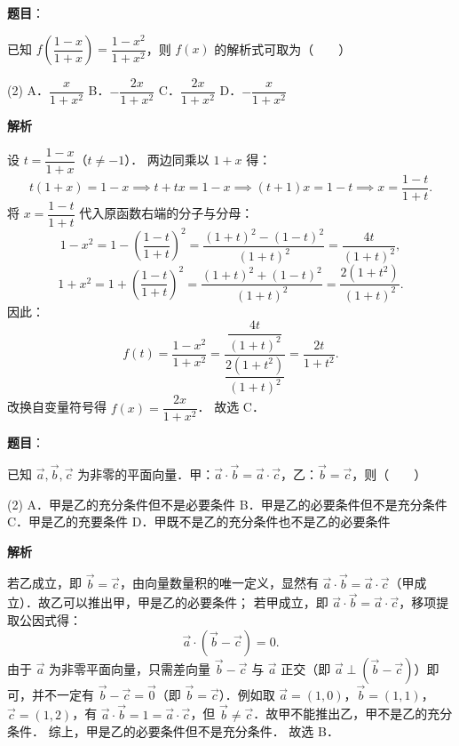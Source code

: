 \begin{answer}

\textbf{题目}：

已知 $f\left(\dfrac{1 - x}{1 + x}\right) = \dfrac{1 - x^2}{1 + x^2}$，则 $f(x)$ 的解析式可取为\mbox{（　　）}

\begin{gkopts}(2)
\task A．$\dfrac{x}{1 + x^2}$
\task B．$-\dfrac{2x}{1 + x^2}$
\task C．$\dfrac{2x}{1 + x^2}$
\task D．$-\dfrac{x}{1 + x^2}$
\end{gkopts}

\textbf{解析}

设 $t = \dfrac{1 - x}{1 + x}$（$t \neq -1$）．
两边同乘以 $1 + x$ 得：
\nopagebreak[4]
\[
t(1 + x) = 1 - x \implies t + tx = 1 - x \implies (t + 1)x = 1 - t \implies x = \frac{1 - t}{1 + t}.
\]
将 $x = \dfrac{1 - t}{1 + t}$ 代入原函数右端的分子与分母：
\nopagebreak[4]
\[
1 - x^2 = 1 - \left(\frac{1 - t}{1 + t}\right)^2 = \frac{(1 + t)^2 - (1 - t)^2}{(1 + t)^2} = \frac{4t}{(1 + t)^2},
\]
\nopagebreak[4]
\[
1 + x^2 = 1 + \left(\frac{1 - t}{1 + t}\right)^2 = \frac{(1 + t)^2 + (1 - t)^2}{(1 + t)^2} = \frac{2(1 + t^2)}{(1 + t)^2}.
\]
因此：
\nopagebreak[4]
\[
f(t) = \frac{1 - x^2}{1 + x^2} = \frac{\dfrac{4t}{(1 + t)^2}}{\dfrac{2(1 + t^2)}{(1 + t)^2}} = \frac{2t}{1 + t^2}.
\]
改换自变量符号得 $f(x) = \dfrac{2x}{1 + x^2}$．
故选 C．


\end{answer}
\begin{answer}

\textbf{题目}：

已知 $\vec{a}, \vec{b}, \vec{c}$ 为非零的平面向量．甲：$\vec{a} \cdot \vec{b} = \vec{a} \cdot \vec{c}$，乙：$\vec{b} = \vec{c}$，则\mbox{（　　）}

\begin{gkopts}(2)
\task A．甲是乙的充分条件但不是必要条件
\task B．甲是乙的必要条件但不是充分条件
\task C．甲是乙的充要条件
\task D．甲既不是乙的充分条件也不是乙的必要条件
\end{gkopts}

\textbf{解析}

若乙成立，即 $\vec{b} = \vec{c}$，由向量数量积的唯一定义，显然有 $\vec{a} \cdot \vec{b} = \vec{a} \cdot \vec{c}$（甲成立）．故乙可以推出甲，甲是乙的必要条件；
若甲成立，即 $\vec{a} \cdot \vec{b} = \vec{a} \cdot \vec{c}$，移项提取公因式得：
\nopagebreak[4]
\[
\vec{a} \cdot (\vec{b} - \vec{c}) = 0.
\]
由于 $\vec{a}$ 为非零平面向量，只需差向量 $\vec{b} - \vec{c}$ 与 $\vec{a}$ 正交（即 $\vec{a} \perp (\vec{b} - \vec{c})$）即可，并不一定有 $\vec{b} - \vec{c} = \vec{0}$（即 $\vec{b} = \vec{c}$）．例如取 $\vec{a} = (1, 0)$，$\vec{b} = (1, 1)$，$\vec{c} = (1, 2)$，有 $\vec{a} \cdot \vec{b} = 1 = \vec{a} \cdot \vec{c}$，但 $\vec{b} \neq \vec{c}$．故甲不能推出乙，甲不是乙的充分条件．
综上，甲是乙的必要条件但不是充分条件．
故选 B．


\end{answer}
